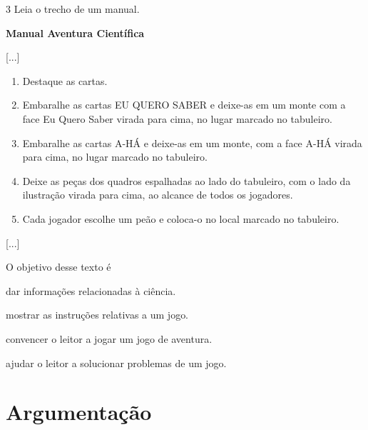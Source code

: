 \num{3} Leia o trecho de um manual.

\begin{myquote}
\textbf{Manual Aventura Científica}

{[}...{]}

\begin{enumerate}
\item Destaque as cartas.
\item Embaralhe as cartas EU QUERO SABER e deixe-as em um monte com a
face Eu Quero Saber virada para cima, no lugar marcado no tabuleiro.
\item Embaralhe as cartas A-HÁ e deixe-as em um monte, com a face A-HÁ
virada para cima, no lugar marcado no tabuleiro.
\item Deixe as peças dos quadros espalhadas ao lado do tabuleiro, com o
lado da ilustração virada para cima, ao alcance de todos os jogadores.
\item Cada jogador escolhe um peão e coloca-o no local marcado no
tabuleiro.
\end{enumerate}

{[}...{]}

\end{myquote}

O objetivo desse texto é

\begin{escolha}[itemsep=-5pt]
\item dar informações relacionadas à ciência.

\item mostrar as instruções relativas a um jogo.

\item convencer o leitor a jogar um jogo de aventura.

\item ajudar o leitor a solucionar problemas de um jogo.
\end{escolha}

\chapter{Argumentação}



